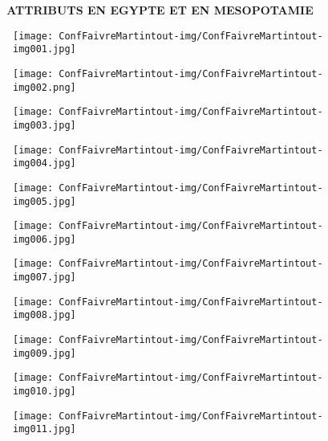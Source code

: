 \documentclass[a4paper]{article}
\title{}
\author{}
\date{2012-12-19}
\begin{document}
\clearpage\setcounter{page}{1}\pagestyle{Standard}
{
\textbf{\ \ \ \ ATTRIBUTS EN EGYPTE ET EN MESOPOTAMIE\ \ }}

\begin{figure}
\centering
\texttt{[image: ConfFaivreMartintout-img/ConfFaivreMartintout-img001.jpg]}
\end{figure}
\begin{figure}
\centering
\texttt{[image: ConfFaivreMartintout-img/ConfFaivreMartintout-img002.png]}
\end{figure}
\begin{figure}
\centering
\texttt{[image: ConfFaivreMartintout-img/ConfFaivreMartintout-img003.jpg]}
\end{figure}
\begin{figure}
\centering
\texttt{[image: ConfFaivreMartintout-img/ConfFaivreMartintout-img004.jpg]}
\end{figure}
\begin{figure}
\centering
\texttt{[image: ConfFaivreMartintout-img/ConfFaivreMartintout-img005.jpg]}
\end{figure}
\begin{figure}
\centering
\texttt{[image: ConfFaivreMartintout-img/ConfFaivreMartintout-img006.jpg]}
\end{figure}
\begin{figure}
\centering
\texttt{[image: ConfFaivreMartintout-img/ConfFaivreMartintout-img007.jpg]}
\end{figure}
\begin{figure}
\centering
\texttt{[image: ConfFaivreMartintout-img/ConfFaivreMartintout-img008.jpg]}
\end{figure}
\begin{figure}
\centering
\texttt{[image: ConfFaivreMartintout-img/ConfFaivreMartintout-img009.jpg]}
\end{figure}
\begin{figure}
\centering
\texttt{[image: ConfFaivreMartintout-img/ConfFaivreMartintout-img010.jpg]}
\end{figure}
\begin{figure}
\centering
\texttt{[image: ConfFaivreMartintout-img/ConfFaivreMartintout-img011.jpg]}
\end{figure}
\end{document}
